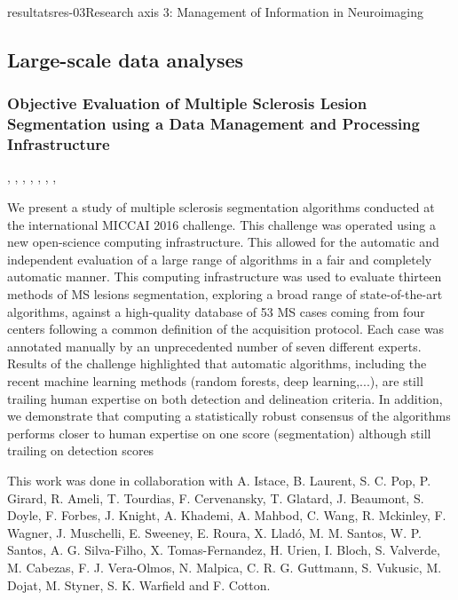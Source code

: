 \documentclass{ra2018}
\begin{document}
\begin{module}{resultats}{res-03}{Research axis 3: Management of Information in Neuroimaging}

\subsection{Large-scale data analyses}
\subsubsection{Objective Evaluation of Multiple Sclerosis Lesion Segmentation using a Data Management and Processing Infrastructure}
\begin{participants}
      ,
      ,
      ,
      ,
      ,
      ,
      ,
\end{participants}
We present a study of multiple sclerosis segmentation algorithms conducted at the international MICCAI 2016 challenge. This challenge was operated using a new open-science computing infrastructure. This allowed for the automatic and independent evaluation of a large range of algorithms in a fair and completely automatic manner. This computing infrastructure was used to evaluate thirteen methods of MS lesions segmentation, exploring a broad range of state-of-the-art algorithms, against a high-quality database of 53 MS cases coming from four centers following a common definition of the acquisition protocol. Each case was annotated manually by an unprecedented number of seven different experts. Results of the challenge highlighted that automatic algorithms, including the recent machine learning methods (random forests, deep learning,...), are still trailing human expertise on both detection and delineation criteria. In addition, we demonstrate that computing a statistically robust consensus of the algorithms performs closer to human expertise on one score (segmentation) although still trailing on detection scores~\cite{commowick:inserm-01847873}

This work was done in collaboration with A. Istace, B. Laurent, S. C. Pop, P. Girard, R. Ameli, T. Tourdias, F. Cervenansky, T. Glatard, J. Beaumont, S. Doyle, F. Forbes, J. Knight, A. Khademi, A. Mahbod, C. Wang, R. Mckinley, F. Wagner, J. Muschelli, E. Sweeney, E. Roura, X. Lladó, M. M. Santos, W. P. Santos, A. G. Silva-Filho, X. Tomas-Fernandez, H. Urien, I. Bloch, S. Valverde, M. Cabezas, F. J. Vera-Olmos, N. Malpica, C. R. G. Guttmann, S. Vukusic, M. Dojat, M. Styner, S. K. Warfield and F. Cotton.


\end{module}
\end{document}
